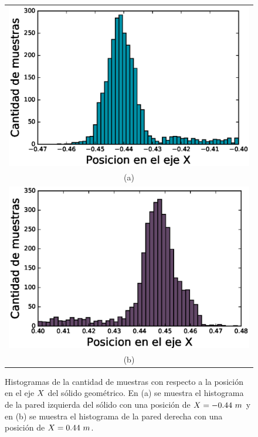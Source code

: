 \begin{figure}%
    \centering
    \begin{tabular}{c}
      \includegraphics[width=.70\textwidth]{images/ErrRegionIZQX.eps}\\
      (a)\\
      \includegraphics[width=.70\textwidth]{images/ErrRegionDERX.eps}\\
      (b)
    \end{tabular}
  \captionsetup{font=footnotesize}
    \caption{\label{f:EstadisticaX}Histogramas de la cantidad de muestras con 
    respecto a la posición en el eje $\mathnormal X$ del sólido geométrico. En (a) se 
    muestra el histograma de la pared izquierda del sólido con una posición de 
    $\mathnormal X = -0.44~m$ y en (b) se muestra el histograma de la pared derecha 
    con una posición de $\mathnormal X = 0.44~m$. }
\end{figure}



